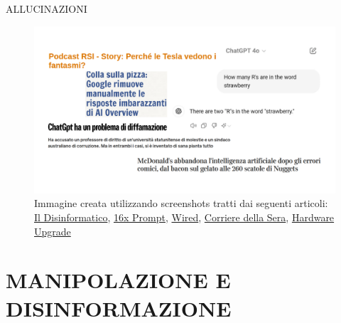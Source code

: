 \documentclass[aspectratio=1610]{beamer}
\begin{document}
\begin{frame}{ALLUCINAZIONI}
    \begin{figure}
        \includegraphics[width=.9\linewidth]{img/allucinazioni.png}
        \caption{
            Immagine creata utilizzando screenshots tratti dai seguenti articoli:
            \href{https://attivissimo.blogspot.com/2023/05/podcast-rsi-story-perche-le-tesla.html}{Il Disinformatico}, 
            \href{https://prompt.16x.engineer/blog/why-chatgpt-cant-count-rs-in-strawberry}{16x Prompt}, 
            \href{https://www.wired.it/article/chatgpt-diffamazione-molestie-problema/}{Wired}, 
            \href{https://www.corriere.it/esteri/24_giugno_23/mcdonalds-abbandona-intelligenza-artificiale-e67cd9a6-7ebd-4436-9ff0-de55eb486xlk.shtml}{Corriere della Sera}, 
            \href{https://www.hwupgrade.it/news/web/colla-sulla-pizza-google-rimuove-manualmente-le-risposte-imbarazzanti-di-ai-overview_127538.html}{Hardware Upgrade}
        }
    \end{figure}
\end{frame}

\section{MANIPOLAZIONE E DISINFORMAZIONE}
\end{document}
